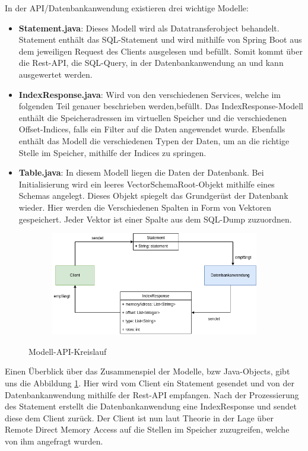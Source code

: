 In der API/Datenbankanwendung existieren drei wichtige Modelle:

\begin{itemize}
 \item \textbf{Statement.java}: Dieses Modell wird als Datatransferobject behandelt. Statement enthält das SQL-Statement und wird mithilfe von Spring Boot aus dem jeweiligen Request des Clients ausgelesen und befüllt. Somit kommt über die Rest-API, die SQL-Query, in der Datenbankanwendung an und kann ausgewertet werden.
 \item \textbf{IndexResponse.java}: Wird von den verschiedenen Services, welche im folgenden Teil genauer beschrieben werden,befüllt. Das IndexResponse-Modell enthält die Speicheradressen im virtuellen Speicher und die verschiedenen Offset-Indices, falls ein Filter auf die Daten angewendet wurde. Ebenfalls enthält das Modell die verschiedenen Typen der Daten, um an die richtige Stelle im Speicher, mithilfe der Indices zu springen.
 \item \textbf{Table.java}: In diesem Modell liegen die Daten der Datenbank. Bei Initialisierung wird ein leeres VectorSchemaRoot-Objekt mithilfe eines Schemas angelegt. Dieses Objekt spiegelt das Grundgerüst der Datenbank wieder. Hier werden die Verschiedenen Spalten in Form von Vektoren gespeichert. Jeder Vektor ist einer Spalte aus dem SQL-Dump zuzuordnen.
\end{itemize}

\begin{figure}[h]
  \centering
  \begin{subfigure}[b]{1.0\textwidth}
    \includegraphics[width=1.0\linewidth]{img/sendrecieve}
  \end{subfigure}
  \caption{Modell-API-Kreislauf}
  \label{graf_2}
\end{figure}

Einen Überblick über das Zusammenspiel der Modelle, bzw Java-Objects, gibt uns die Abbildung \ref{graf_2}. 
Hier wird vom Client ein Statement gesendet und von der Datenbankanwendung mithilfe der Rest-API empfangen. Nach der Prozessierung des Statement erstellt die Datenbankanwendung eine IndexResponse und sendet diese dem Client zurück.
Der Client ist nun laut Theorie in der Lage über Remote Direct Memory Access auf die Stellen im Speicher zuzugreifen, welche von ihm angefragt wurden.


